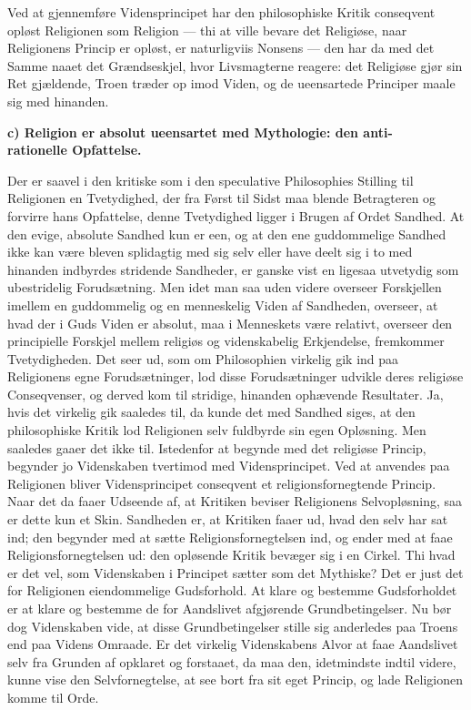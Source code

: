 \documentclass[12pt]{book}
\newcommand{\runhead}[1]{%
  \medskip\begin{center}{\bfseries #1}\end{center}\medskip}
\begin{document}
Ved at gjennemføre Vidensprincipet har den philosophiske Kritik
conseqvent opløst Religionen som Religion --- thi at ville bevare
det Religiøse, naar Religionens Princip er opløst, er naturligviis
Nonsens --- den har da med det Samme naaet det Grændseskjel, hvor
Livsmagterne reagere: det Religiøse gjør sin Ret gjældende, Troen
træder op imod Viden, og de ueensartede Principer maale sig med
hinanden.
\runhead{c) Religion er absolut ueensartet med Mythologie: den anti-\\
rationelle Opfattelse.}

Der er saavel i den kritiske som i den speculative Philosophies
Stilling til Religionen en Tvetydighed, der fra Først til Sidst maa
blende Betragteren og forvirre hans Opfattelse, denne Tvetydighed
ligger i Brugen af Ordet Sandhed. At den evige, absolute Sandhed kun
er een, og at den ene guddommelige Sandhed ikke kan være bleven
splidagtig med sig selv eller have deelt sig i to med hinanden
indbyrdes stridende Sandheder, er ganske vist en ligesaa utvetydig
som ubestridelig Forudsætning. Men idet man saa uden videre overseer
Forskjellen imellem en guddommelig og en menneskelig Viden af
Sandheden, overseer, at hvad der i Guds Viden er absolut, maa i
Menneskets være relativt, overseer den principielle Forskjel mellem
religiøs og videnskabelig Erkjendelse, fremkommer Tvetydigheden. Det
seer ud, som om Philosophien virkelig gik ind paa Religionens egne
Forudsætninger, lod disse Forudsætninger udvikle deres religiøse
Conseqvenser, og derved kom til stridige, hinanden ophævende
Resultater. Ja, hvis det virkelig gik saaledes til, da kunde det med
Sandhed siges, at den philosophiske Kritik lod Religionen selv
fuldbyrde sin egen Opløsning. Men saaledes gaaer det ikke til.
Istedenfor at begynde med det religiøse Princip, begynder jo
Videnskaben tvertimod med Vidensprincipet. Ved at anvendes paa
Religionen bliver Vidensprincipet conseqvent et religionsfornegtende
Princip. Naar det da faaer Udseende af, at Kritiken beviser
Religionens Selvopløsning, saa er dette kun et Skin. Sandheden er,
at Kritiken faaer ud, hvad den selv har sat ind; den begynder med at
sætte Religionsfornegtelsen ind, og ender med at faae
Religionsfornegtelsen ud: den opløsende Kritik bevæger sig i en
Cirkel. Thi hvad er det vel, som Videnskaben i Principet sætter som
det Mythiske? Det er just det for
Religionen eiendommelige Gudsforhold. At klare og bestemme
Gudsforholdet er at klare og bestemme de for Aandslivet afgjørende
Grundbetingelser. Nu bør dog Videnskaben vide, at disse
Grundbetingelser stille sig anderledes paa Troens end paa Videns
Omraade. Er det virkelig Videnskabens Alvor at faae Aandslivet selv
fra Grunden af opklaret og forstaaet, da maa den, idetmindste indtil
videre, kunne vise den Selvfornegtelse, at see bort fra sit eget
Princip, og lade Religionen komme til Orde.
\end{document}
